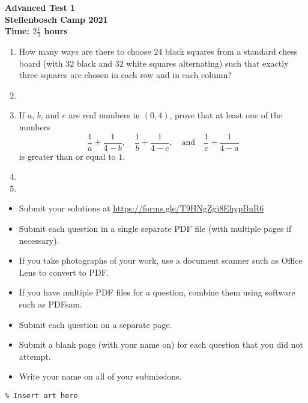 \documentclass{article}
\begin{document}
\thispagestyle{empty}

\begin{center}
  \textbf{\Large Advanced Test 1}
  \\ \vspace{1em}
  \textbf{\large Stellenbosch Camp 2021}
  \\ \vspace{1em}
  \textbf{\large Time: $2\frac{1}{2}$ hours}
\end{center}

\vspace{24pt}

\begin{enumerate}[1.]

\item %
How many ways are there to choose $24$ black squares from a standard chess board (with $32$ black and $32$ white squares alternating) such that exactly three squares are chosen in each row and in each column?


\item %


\item %
If $a$, $b$, and $c$ are real numbers in $(0,4)$, prove that at least one of the numbers
\[ \frac{1}{a} +\frac{1}{4-b}, \quad \frac{1}{b} +\frac{1}{4-c}, \quad\text{and}\quad \frac{1}{c} +\frac{1}{4-a} \]
is greater than or equal to $1$.


\item %


\item %

\end{enumerate}


\vfill
\begin{itemize}
	\item Submit your solutions at \href{https://forms.gle/T9HNgZgj8EhypBnR6}{https://forms.gle/T9HNgZgj8EhypBnR6}
	\item Submit each question in a single separate PDF file (with multiple pages if necessary).
	\item If you take photographs of your work, use a document scanner such as Office Lens to convert to PDF.
	\item If you have multiple PDF files for a question, combine them using software such as PDFsam.
\end{itemize}

\begin{itemize}
  \item Submit each question on a separate page.
  \item Submit a blank page (with your name on) for each question that you did not attempt.
  \item Write your name on all of your submissions.
\end{itemize}

\vfill
\centering
\begin{BVerbatim}
\end{BVerbatim}
\end{document}
